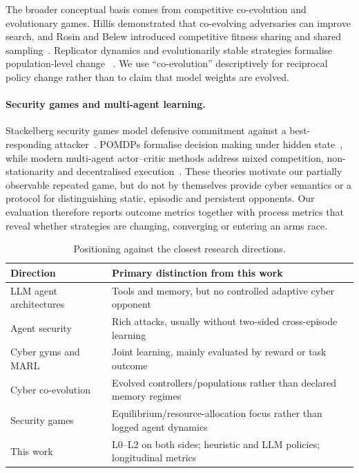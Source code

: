 The broader conceptual basis comes from competitive co-evolution and
evolutionary games. Hillis demonstrated that co-evolving adversaries can
improve search, and Rosin and Belew introduced competitive fitness sharing and
shared sampling~\cite{hillis1990co,rosin1997new}. Replicator dynamics and
evolutionarily stable strategies formalise population-level change
~\cite{hofbauer1998evolutionary,weibull1995evolutionary}. We use
``co-evolution'' descriptively for reciprocal policy change rather than to
claim that model weights are evolved.

\paragraph{Security games and multi-agent learning.}
Stackelberg security games model defensive commitment against a best-responding
attacker~\cite{tambe2011security,sinha2018stackelberg}. POMDPs formalise
decision making under hidden state~\cite{kaelbling1998planning}, while modern
multi-agent actor--critic methods address mixed competition, non-stationarity
and decentralised execution~\cite{lowe2017multi,foerster2018counterfactual}.
These theories motivate our partially observable repeated game, but do not by
themselves provide cyber semantics or a protocol for distinguishing static,
episodic and persistent opponents. Our evaluation therefore reports outcome
metrics together with process metrics that reveal whether strategies are
changing, converging or entering an arms race.

\begin{table}[!t]
\caption{Positioning against the closest research directions.}
\label{tab:gap}
\centering
\begin{tabularx}{\columnwidth}{@{}lX@{}}
\toprule
\textbf{Direction} & \textbf{Primary distinction from this work} \\
\midrule
LLM agent architectures~\cite{shinn2023reflexion,wu2023autogen}
  & Tools and memory, but no controlled adaptive cyber opponent \\
Agent security~\cite{debenedetti2024agentdojo,zhan2024injecagent}
  & Rich attacks, usually without two-sided cross-episode learning \\
Cyber gyms and MARL~\cite{standen2021cyborg,kunz2022multiagent}
  & Joint learning, mainly evaluated by reward or task outcome \\
Cyber co-evolution~\cite{rush2015candles,turner2022analyzing,
hemberg2025evolutionary}
  & Evolved controllers/populations rather than declared memory regimes \\
Security games~\cite{sinha2018stackelberg}
  & Equilibrium/resource-allocation focus rather than logged agent dynamics \\
\midrule
This work
  & L0--L2 on both sides; heuristic and LLM policies; longitudinal metrics \\
\bottomrule
\end{tabularx}
\end{table}

